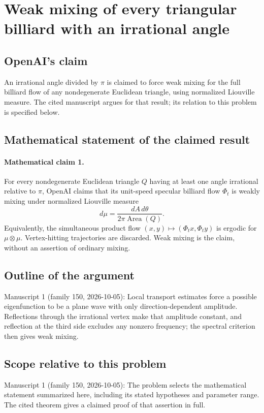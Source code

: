 \documentclass[11pt]{article}
\begin{document}
\section*{Weak mixing of every triangular billiard with an irrational angle}

\subsection{OpenAI's claim}
An irrational angle divided by $\pi$ is claimed to force weak mixing for the full billiard flow of any nondegenerate Euclidean triangle, using normalized Liouville measure. The cited manuscript argues for that result; its relation to this problem is specified below.

\subsection{Mathematical statement of the claimed result}
\paragraph{Mathematical claim 1.} For every nondegenerate Euclidean triangle $Q$ having at least one angle irrational relative to $\pi$, OpenAI claims that its unit-speed specular billiard flow $\Phi_t$ is weakly mixing under normalized Liouville measure
\[
d\mu=\frac{dA\,d\theta}{2\pi\operatorname{Area}(Q)}.
\]
Equivalently, the simultaneous product flow $(x,y)\mapsto(\Phi_tx,\Phi_ty)$ is ergodic for $\mu\otimes\mu$. Vertex-hitting trajectories are discarded. Weak mixing is the claim, without an assertion of ordinary mixing.

\subsection{Outline of the argument}
Manuscript 1 (family 150, 2026-10-05): Local transport estimates force a possible eigenfunction to be a plane wave with only direction-dependent amplitude. Reflections through the irrational vertex make that amplitude constant, and reflection at the third side excludes any nonzero frequency; the spectral criterion then gives weak mixing.

\subsection{Scope relative to this problem}
Manuscript 1 (family 150, 2026-10-05): The problem selects the mathematical statement summarized here, including its stated hypotheses and parameter range. The cited theorem gives a claimed proof of that assertion in full.
\end{document}
